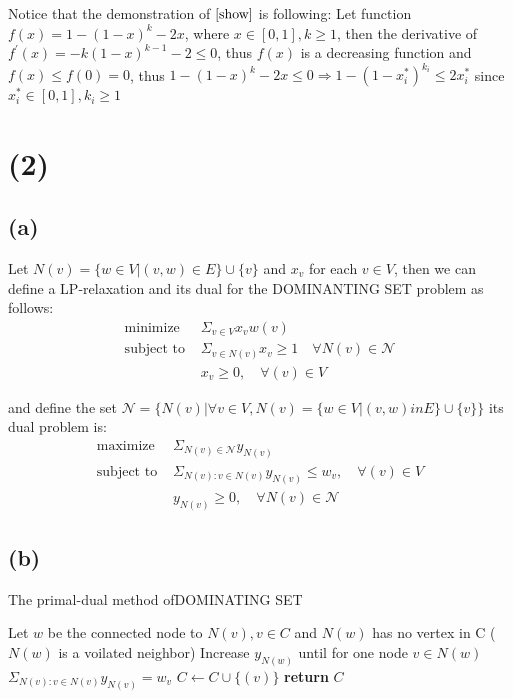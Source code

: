 \documentclass[a4paper,12pt]{article}
\def\N{{\mathcal{N}}}
\begin{document}
Notice that the demonstration of $\eqref{show}$ is following:
Let function $f(x)=1-(1-x)^k -2x$, where $x \in [0,1], k\geq 1$, then the derivative of $f^{\prime}(x)=-k (1-x)^{k-1}-2 \leq 0$, thus $f(x) $ is a decreasing function and $f(x) \leq f(0)=0$, thus $1- (1-x)^k-2x \leq 0 \Rightarrow 1-(1-x_i^*)^{k_i} \leq 2x_i^* $ since $x^*_i \in [0,1], k_i \geq 1$



\section*{(2) }
\subsection*{(a)}
Let $N(v)=\{w \in V| (v,w) \in E\} \cup \{v\}$ and $x_v$ for each $v \in V$, then we can define a LP-relaxation and its dual for the DOMINANTING SET  problem as follows:  
\begin{align}
\text{minimize } & \Sigma_{ v \in V} x_v w(v)\\
\text{subject to } &  \Sigma_{ v \in N(v) } x_{v}\geq 1 \quad \forall {N(v)} \in \N \\
& x_{v} \geq 0, \quad \forall (v) \in V
\end{align}
 
and define the set $\N=\{N(v)   | \forall v \in V, N(v) =\{w \in V| (v,w) in E\} \cup \{v\}  \}$ its dual problem is:
\begin{align}
\text{maximize } & \Sigma_{N(v) \in \N}  y_{N(v)}\\
\text{subject to } &  \Sigma_{N(v): v \in N(v) } y_{N(v)} \leq w_{v}, \quad  \forall (v) \in V \\
& y_{N(v)} \geq 0, \quad  \forall {N(v)} \in \N
\end{align}

\subsection*{(b)}          
 
\begin{algorithm}
\caption{The primal-dual method ofDOMINATING SET } 
\begin{algorithmic} 
\State  Let $w$ be the connected node to $N(v), v \in C$ and $N(w)$ has no vertex in C ($N(w)$ is a voilated neighbor)
\State Increase $y_{N(w)}$ until for one node $v \in N(w)$ $\Sigma_{N(v): v \in N(v) } y_{N(v)} = w_{v} $
\State  $C \gets C \cup \{(v)\}$ 
\EndWhile 
\State \textbf{return} $C$ 
\end{algorithmic}
\end{algorithm}
\end{document}
